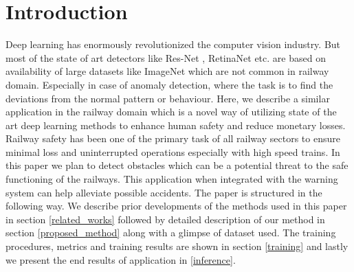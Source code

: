 \documentclass[conference]{IEEEtran}
\begin{document}
\section{Introduction}
Deep learning has enormously revolutionized the computer vision industry. But most of the state of art detectors like Res-Net \cite{he2015deep}, RetinaNet \cite{lin2018focal} etc. are based on availability of large datasets like ImageNet \cite{5206848} which are not common in railway domain. Especially in case of anomaly detection, where the task is to find the deviations from the normal pattern or behaviour. Here, we describe a similar application in the railway domain which is a novel way of utilizing state of the art deep learning methods to enhance human safety and reduce monetary losses. Railway safety has been one of the primary task of all railway sectors to ensure minimal loss and uninterrupted operations especially with high speed trains. In this paper we plan to detect obstacles which can be a potential threat to the safe functioning of the railways. This application when integrated with the warning system can help alleviate possible accidents. The paper is structured in the following way. We describe prior developments of the methods used in this paper in section \ref{related_works} followed by detailed description of our method in section \ref{proposed_method} along with a glimpse of dataset used. The training procedures, metrics and training results are shown in section \ref{training} and lastly we present the end results of application in \ref{inference}. 
\end{document}
